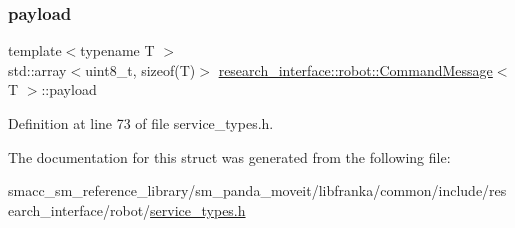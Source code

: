 \mbox{\label{structresearch__interface_1_1robot_1_1CommandMessage_a0af29b5860ddcb6ea5724a2116f38a7a}} 
\subsubsection{\texorpdfstring{payload}{payload}}
{\footnotesize\ttfamily template$<$typename T $>$ \\
std\+::array$<$uint8\+\_\+t, sizeof(T)$>$ \hyperlink{structresearch__interface_1_1robot_1_1CommandMessage}{research\+\_\+interface\+::robot\+::\+Command\+Message}$<$ T $>$\+::payload}



Definition at line 73 of file service\+\_\+types.\+h.



The documentation for this struct was generated from the following file\+:\begin{DoxyCompactItemize}
\item 
smacc\+\_\+sm\+\_\+reference\+\_\+library/sm\+\_\+panda\+\_\+moveit/libfranka/common/include/research\+\_\+interface/robot/\hyperlink{service__types_8h}{service\+\_\+types.\+h}\end{DoxyCompactItemize}
